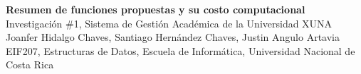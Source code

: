 \documentclass[12pt]{article}
\begin{document}
\begin{center}
{\Large \textbf{Resumen de funciones propuestas y su costo computacional}}\\[0.3em]
{\large Investigación \#1, Sistema de Gestión Académica de la Universidad XUNA}\\[0.2em]
Joanfer Hidalgo Chaves, Santiago Hernández Chaves, Justin Angulo Artavia\\
EIF207, Estructuras de Datos, Escuela de Informática, Universidad Nacional de Costa Rica
\end{center}

\vspace{1em}


\end{document}
